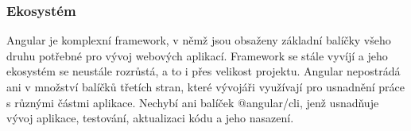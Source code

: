 \subsubsection{Ekosystém}

Angular je komplexní framework, v němž jsou obsaženy základní balíčky všeho druhu potřebné pro vývoj webových aplikací. 
Framework se stále vyvíjí a jeho ekosystém se neustále rozrůstá, a to i přes velikost projektu. 
Angular nepostrádá ani v množství balíčků třetích stran, které vývojáři využívají pro usnadnění práce s různými částmi aplikace. 
Nechybí ani balíček @angular/cli, jenž usnadňuje vývoj aplikace, testování, aktualizaci kódu a jeho nasazení.\cite{angulardev,learningangular}